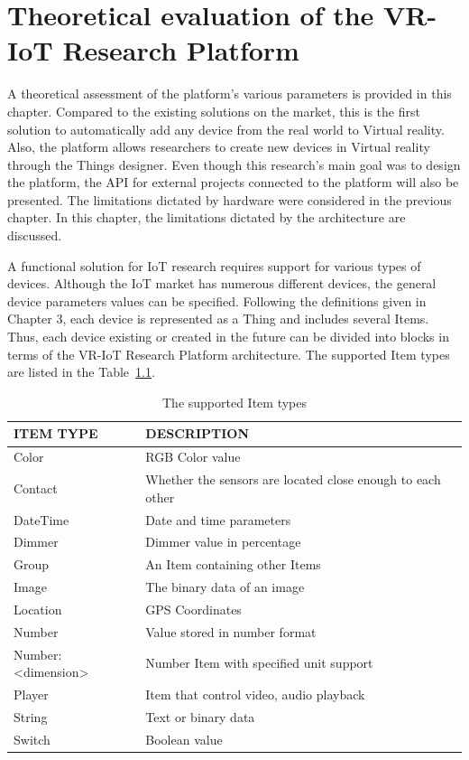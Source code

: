 
\chapter{Theoretical evaluation of the VR-IoT Research Platform}

A theoretical assessment of the platform's various parameters is provided in this chapter. Compared to the existing solutions on the market, this is the first solution to automatically add any device from the real world to Virtual reality. Also, the platform allows researchers to create new devices in Virtual reality through the Things designer. Even though this research's main goal was to design the platform, the API for external projects connected to the platform will also be presented. The limitations dictated by hardware were considered in the previous chapter. In this chapter, the limitations dictated by the architecture are discussed.

A functional solution for IoT research requires support for various types of devices. Although the IoT market has numerous different devices, the general device parameters values can be specified. Following the definitions given in Chapter 3, each device is represented as a Thing and includes several Items. Thus, each device existing or created in the future can be divided into blocks in terms of the VR-IoT Research Platform architecture. The supported Item types are listed in the Table~\ref{tab:items-table}.

\begin{table}
  \centering
  \begin{threeparttable}[c]
    \caption{The supported Item types}
    \label{tab:items-table}
    \begin{tabular}{ll}
      \toprule
      ITEM TYPE    &         DESCRIPTION                 \\
      \midrule
      Color &	RGB Color value \\
      Contact & Whether the sensors are located close enough to each other \\
      DateTime & Date and time parameters \\
      Dimmer &	Dimmer value in percentage \\
      Group &	An Item containing other Items \\
      Image &	The binary data of an image \\
      Location & GPS Coordinates \\
      Number & Value stored in number format \\
      Number:<dimension> & Number Item with specified unit support \\
      Player & Item that control video, audio playback \\
      String &	Text or binary data \\
      Switch & Boolean value \\
      \bottomrule
    \end{tabular}
  \end{threeparttable}
\end{table}

